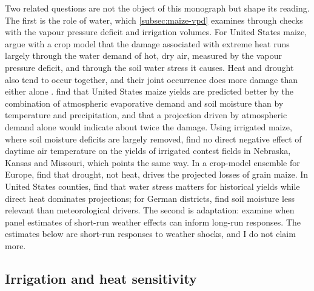 Two related questions are not the object of this monograph but shape its reading. The first is the role of water, which \cref{subsec:maize-vpd} examines through checks with the vapour pressure deficit and irrigation volumes. For United States maize, \textcite{lobell2013} argue with a crop model that the damage associated with extreme heat runs largely through the water demand of hot, dry air, measured by the vapour pressure deficit, and through the soil water stress it causes. Heat and drought also tend to occur together, and their joint occurrence does more damage than either alone \parencite{haqiqi2021,lesk2022}. \textcite{rigden2020} find that United States maize yields are predicted better by the combination of atmospheric evaporative demand and soil moisture than by temperature and precipitation, and that a projection driven by atmospheric demand alone would indicate about twice the damage. Using irrigated maize, where soil moisture deficits are largely removed, \textcite{carter2016} find no direct negative effect of daytime air temperature on the yields of irrigated contest fields in Nebraska, Kansas and Missouri, which points the same way. In a crop-model ensemble for Europe, \textcite{webber2018} find that drought, not heat, drives the projected losses of grain maize. In United States counties, \textcite{ortizbobea2019} find that water stress matters for historical yields while direct heat dominates projections; for German districts, \textcite{lischeid2022} find soil moisture less relevant than meteorological drivers. The second is adaptation: \textcite{merel2021} examine when panel estimates of short-run weather effects can inform long-run responses. The estimates below are short-run responses to weather shocks, and I do not claim more.

\subsection{Irrigation and heat sensitivity}

